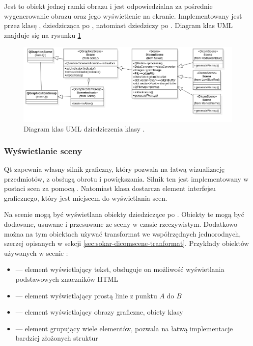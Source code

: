 \label{sec:sokar-dicomscene}

Jest to obiekt jednej ramki obrazu i jest odpowiedzialna za pośrednie wygenerowanie obrazu oraz jego wyświetlenie na ekranie.
Implementowany jest przez klasę , dziedzicząca po , natomiast  dziedziczy po .
Diagram klas UML znajduje się na rysunku \ref{uml:sokar-dicomscene}

\begin{figure}[!htbp]
    \centering
    \includegraphics[width=\textwidth]{img/uml/dicom-scene.png}
    \caption{Diagram klas UML dziedziczenia klasy .}
    \label{uml:sokar-dicomscene}
\end{figure}

\subsubsection{Wyświetlanie sceny}
\par
Qt zapewnia własny silnik graficzny, który pozwala na łatwą wizualizację przedmiotów, z obsługą obrotu i powiększania.
Silnik ten jest implementowany w postaci scen za pomocą .
Natomiast klasa  dostarcza element interfejsu graficznego, który jest miejscem do wyświetlania scen.
\par
Na scenie mogą być wyświetlana obiekty dziedziczące po .
Obiekty te mogą być dodawane, usuwane i przesuwane ze sceny w czasie rzeczywistym.
Dodatkowo można  na tym obiektach używać transformat we współrzędnych jednorodnych, szerzej opisanych w sekcji \ref{sec:sokar-dicomscene-tranformat}.
Przykłady obiektów używanych w scenie :
\begin{itemize}
    \item {} --- element wyświetlający tekst, obsługuje on możliwość wyświetlania podstawowych znaczników HTML
    \item {} --- element wyświetlający prostą linie z punktu $A$ do $B$
    \item {} --- element wyświetlający obrazy graficzne, obiety klasy 
    \item {} --- element grupujący wiele elementów, pozwala na łatwą implementacje bardziej złożonych struktur
\end{itemize}

